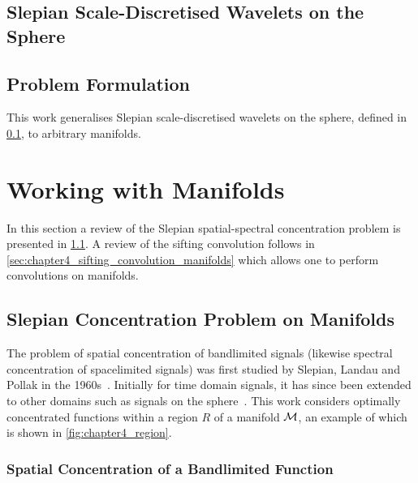 

\subsection{Slepian Scale-Discretised Wavelets on the Sphere}\label{sec:chapter4_slepian_scale_discretised_wavelets_sphere}

\subsection{Problem Formulation}

This work generalises Slepian scale-discretised wavelets on the sphere, defined in \cref{sec:chapter4_slepian_scale_discretised_wavelets_sphere}, to arbitrary manifolds.

\section{Working with Manifolds}

In this section a review of the Slepian spatial-spectral concentration problem is presented in \cref{sec:chapter4_slepian_concentration_problem_manifolds}.
A review of the sifting convolution follows in \cref{sec:chapter4_sifting_convolution_manifolds} which allows one to perform convolutions on manifolds.

\subsection{Slepian Concentration Problem on Manifolds}\label{sec:chapter4_slepian_concentration_problem_manifolds}

The problem of spatial concentration of bandlimited signals (likewise spectral concentration of spacelimited signals) was first studied by Slepian, Landau and Pollak in the 1960s~\cite{Slepian1961,Landau1961,Landau1962}.
Initially for time domain signals, it has since been extended to other domains such as signals on the sphere~\cite{Simons2006,Roddy2021a,Xu1983,Wieczorek2005}.
This work considers optimally concentrated functions within a region \(R\) of a manifold \(\mathcal{M}{}\), an example of which is shown in \cref{fig:chapter4_region}.



\subsubsection{Spatial Concentration of a Bandlimited Function}

